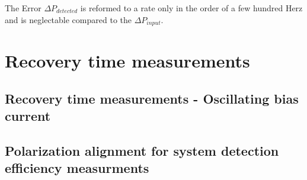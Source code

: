 The Error  $\Delta P_{detected} $ is reformed to a rate only in the order of a few hundred Herz and
is neglectable compared to the  $\Delta P_{input}$.


\section{Recovery time measurements}\label{sec:Recovery time measurements}

\subsection{Recovery time measurements - Oscillating bias current} \label{subsec:recovery-time-measurements---oscillating_bias_current}
\subsection{Polarization alignment for system detection efficiency measurments} \label{subsec:polarization_alignment_for_system_detection_efficiency_measurments}

